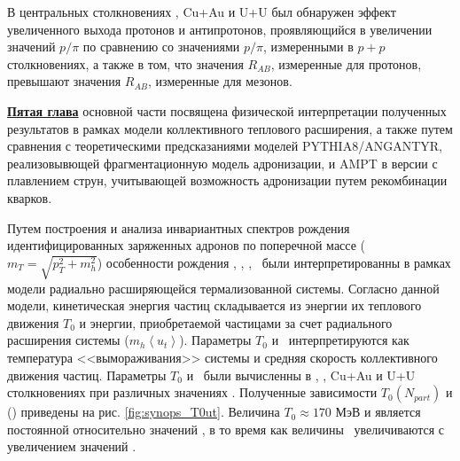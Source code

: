 \begin{comment}
\begin{figure}[] 
	\centerfloat
	\includegraphics [width=0.7\linewidth]{Results/DrawMesons_small.png}
	\caption{Значения факторов ядерной модификации ($R_{AB}$), измеренные для легких адронов(\pipm, \Kpm, \prots, $\pi^{0}$, $\phi$) в центральных и периферических столкновениях \pal \ и \heau.} 
	\label{img:synops_DrawMesonsSmall}
\end{figure}

\begin{figure}[] 
	\centerfloat
	\includegraphics [width=0.7\linewidth]{Results/DrawMesons_large.png}
	\caption{Значения факторов ядерной модификации ($R_{AB}$), измеренные для легких адронов(\pipm, \Kpm, \prots, $\pi^{0}$, $\phi$) в центральных и периферических столкновениях Cu+Au и U+U.} 
	\label{img:synops_DrawMesonsLarge}
\end{figure}
\end{comment}

В центральных столкновениях \heau, Cu+Au и U+U был обнаружен эффект увеличенного выхода протонов и антипротонов, проявляющийся в увеличении значений $p/\pi$ по сравнению со значениями $p/\pi$, измеренными в $p+p$ столкновениях, а также в том, что значения $R_{AB}$, измеренные для протонов, превышают значения $R_{AB}$, измеренные для мезонов. 


\underline{\textbf{Пятая глава}} основной части посвящена физической интерпретации полученных результатов в рамках модели коллективного теплового расширения, а также путем сравнения с теоретическими предсказаниями моделей PYTHIA8/ANGANTYR, реализовывющей фрагментационную модель адронизации, и AMPT в версии с плавлением струн, учитывающей возможность адронизации путем рекомбинации кварков.

Путем построения и анализа инвариантных спектров рождения идентифицированных заряженных адронов по поперечной массе ($m_T = \sqrt{p_T^2 +m_h^2}$) особенности рождения \pipm, \Kpm, \prot, \aprot \ были интерпретированны в рамках модели радиально расширяющейся термализованной системы. Согласно данной модели, кинетическая энергия частиц складывается из энергии их теплового движения $T_0$ и энергии, приобретаемой частицами за счет радиального расширения системы ($m_h\left< u_t\right>$). Параметры $T_0$ и \ut \  интерпретируются как температура <<вымораживания>> системы и средняя скорость коллективного движения частиц. Параметры $T_{0}$ и \ut \ были вычисленны в \pal, \heau, Cu+Au и U+U столкновениях при различных значениях \Npart. 
Полученные зависимости $T_{0}(N_{part})$ и \ut(\Npart) приведены на рис. \ref{fig:synops_T0ut}. Величина $T_{0}\approx170$ МэВ и является постоянной относительно значений \Npart, в то время как величины \ut \ увеличиваются с увеличением значений \Npart.

